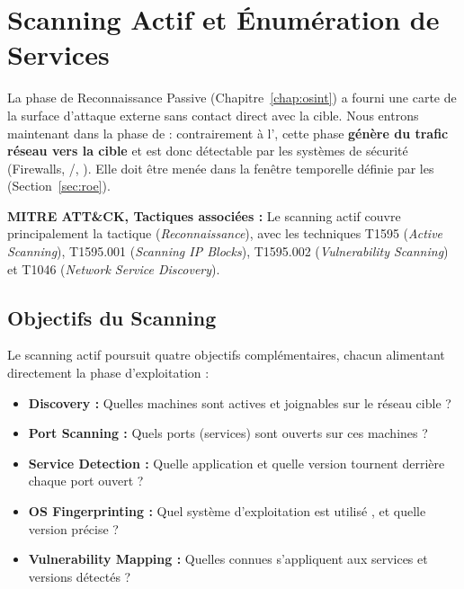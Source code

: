 
\chapter{Scanning Actif et Énumération de Services}
\label{chap:scanning}

La phase de Reconnaissance Passive (Chapitre~\ref{chap:osint}) a fourni une
carte de la surface d'attaque externe sans contact direct avec la cible. Nous
entrons maintenant dans la phase de  : contrairement
à l', cette phase \textbf{génère du trafic réseau vers la cible}
et est donc détectable par les systèmes de sécurité (Firewalls, /,
). Elle doit être menée dans la fenêtre temporelle définie par les
 (Section~\ref{sec:roe}).

\begin{boxinfo}
\textbf{MITRE ATT\&CK, Tactiques associées :}
Le scanning actif couvre principalement la tactique 
(\textit{Reconnaissance}), avec les techniques T1595
(\textit{Active Scanning}), T1595.001 (\textit{Scanning IP Blocks}),
T1595.002 (\textit{Vulnerability Scanning}) et T1046
(\textit{Network Service Discovery}).
\end{boxinfo}

\section{Objectifs du Scanning}
\label{sec:scanning_objectifs}

Le scanning actif poursuit quatre objectifs complémentaires, chacun alimentant
directement la phase d'exploitation :

\begin{itemize}
    \item \textbf{Discovery :} Quelles machines sont actives et joignables
          sur le réseau cible ?
    \item \textbf{Port Scanning :} Quels ports (services) sont ouverts sur
          ces machines ?
    \item \textbf{Service Detection :} Quelle application et quelle version
          tournent derrière chaque port ouvert ?
    \item \textbf{OS Fingerprinting :} Quel système d'exploitation est utilisé
         , et quelle version précise ?
    \item \textbf{Vulnerability Mapping :} Quelles  connues
          s'appliquent aux services et versions détectés ?
\end{itemize}

